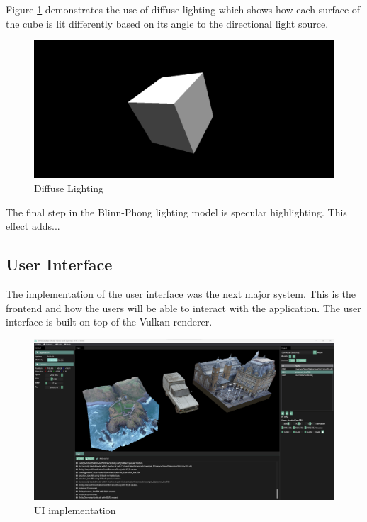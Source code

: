 \documentclass[11pt]{article}
\begin{document}
Figure \ref{fig:diffuse} demonstrates the use of diffuse lighting which shows how each
surface of the cube is lit differently based on its angle to the directional light 
source. 
\begin{figure}[h!]
  \centering
  \includegraphics[width=\textwidth]{images/diffuse_lighting.png}
  \caption{Diffuse Lighting}
  \label{fig:diffuse}
\end{figure}


The final step in the Blinn-Phong lighting model is specular highlighting. This effect
adds...


\subsection{User Interface}
The implementation of the user interface was the next major system. This is
the frontend and how the users will be able to interact with the application.
The user interface is built on top of the Vulkan renderer.


\begin{figure}[h!]
  \centering
  \includegraphics[width=\textwidth]{images/ui_implementation.png}
  \caption{UI implementation}
  \label{fig:user_interface}
\end{figure}
\end{document}

